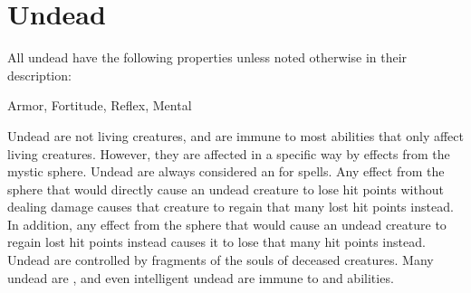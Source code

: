   
        \newpage
        \section{Undead}

        All undead have the following properties unless noted otherwise in their description:
        
    
     Armor,
     Fortitude,
     Reflex,
     Mental
  
     Undead are not living creatures, and are immune to most abilities that only affect living creatures.
    However, they are affected in a specific way by effects from the  mystic sphere.
    Undead are always considered an  for  spells.
    Any effect from the  sphere that would directly cause an undead creature to lose hit points without dealing damage causes that creature to regain that many lost hit points instead.
    In addition, any effect from the  sphere that would cause an undead creature to regain lost hit points instead causes it to lose that many hit points instead.
     Undead are controlled by fragments of the souls of deceased creatures.
    Many undead are , and even intelligent undead are immune to  and  abilities.
  
